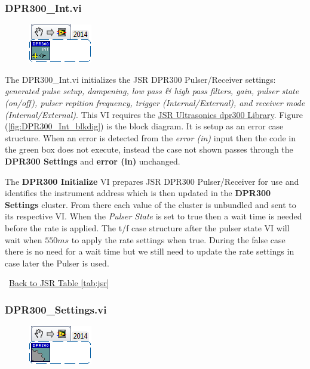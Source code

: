 \documentclass[11pt,a4paper,oldfontcommands]{memoir}
\begin{document}
\subsubsection{DPR300\_Int.vi} \label{DPR300_Int}
\noindent\hrulefill

\begin{figure}[h]
	\includegraphics[scale=0.625]{DPR300_Int_main_02}
	\label{fig:DPR300_Int_main_02}
\end{figure}

The DPR300\_Int.vi initializes the JSR DPR300 Pulser/Receiver settings: \textit{generated pulse setup, dampening, low pass \& high pass filters, gain, pulser state (on/off), pulser repition frequency, trigger (Internal/External), and receiver mode (Internal/External)}. This VI requires the \href{http://sine.ni.com/apps/utf8/niid_web_display.download_page?p_id_guid=EE0D9BE18DD85923E0340003BA7CCD71}{JSR Ultrasonics dpr300 Library}. Figure (\ref{fig:DPR300_Int_blkdig}) is the block diagram.  It is setup as an error case structure. When an error is detected from the \textit{error (in)} input then the code in the green box does not execute, instead the case not shown passes through the \textbf{DPR300 Settings} and \textbf{error (in)} unchanged.

The \textbf{DPR300 Initialize} VI prepares JSR DPR300 Pulser/Receiver for use and identifies the instrument address which is then updated in the \textbf{DPR300 Settings} cluster. From there each value of the cluster is unbundled and sent to its respective VI. When the \textit{Pulser State} is set to true then a wait time is needed before the rate is applied. The t/f case structure after the pulser state VI will wait when $550 ms$ to apply the rate settings when true. During the false case there is no need for a wait time but we still need to update the rate settings in case later the Pulser is used.

\noindent\hrulefill\, \hyperref[tab:jsr]{Back to JSR Table \ref{tab:jsr}}

\subsubsection{DPR300\_Settings.vi} \label{DPR300_settings}
\noindent\hrulefill

\begin{figure}[h]
	\includegraphics[scale=0.625]{DPR300_settings_main_01}
	\label{fig:DPR300_settings_main_01}
\end{figure}
\end{document}

